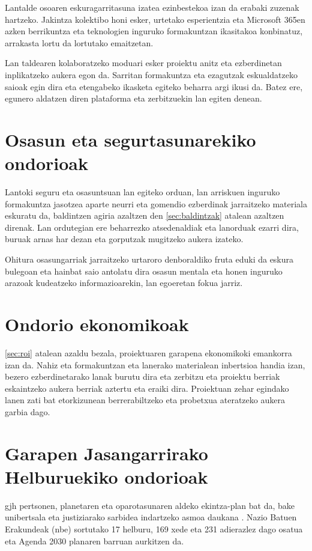 Lantalde osoaren eskuragarritasuna izatea ezinbestekoa izan da erabaki zuzenak hartzeko. Jakintza kolektibo honi esker, urtetako esperientzia eta Microsoft 365en azken berrikuntza eta teknologien inguruko  formakuntzan ikasitakoa konbinatuz, arrakasta lortu da lortutako emaitzetan.

Lan taldearen kolaboratzeko moduari esker proiektu anitz eta ezberdinetan inplikatzeko aukera egon da. Sarritan formakuntza eta ezagutzak eskualdatzeko saioak egin dira eta etengabeko ikasketa egiteko beharra
argi ikusi da. Batez ere, egunero aldatzen diren plataforma eta zerbitzuekin lan egiten denean. 
\section{Osasun eta segurtasunarekiko ondorioak}
Lantoki seguru eta osasuntsuan lan egiteko orduan, lan arriskuen inguruko formakuntza jasotzea aparte neurri eta gomendio ezberdinak jarraitzeko materiala eskuratu da, baldintzen agiria azaltzen den \ref{sec:baldintzak} atalean azaltzen direnak. Lan ordutegian ere beharrezko atsedenaldiak eta lanorduak ezarri dira, buruak arnas har dezan eta gorputzak mugitzeko aukera izateko. 

Ohitura osasungarriak jarraitzeko urtaroro denboraldiko fruta eduki da eskura bulegoan eta hainbat saio antolatu dira osasun mentala eta honen inguruko arazoak kudeatzeko informazioarekin, lan egoeretan fokua jarriz.
\section{Ondorio ekonomikoak}
\ref{sec:roi} atalean azaldu bezala, proiektuaren garapena ekonomikoki emankorra izan da. Nahiz eta formakuntzan eta lanerako materialean inbertsioa handia izan, bezero ezberdinetarako lanak burutu dira eta zerbitzu eta proiektu berriak eskaintzeko aukera berriak aztertu eta eraiki dira. Proiektuan zehar egindako lanen zati bat etorkizunean berrerabiltzeko eta probetxua ateratzeko aukera garbia dago.
\section{Garapen Jasangarrirako Helburuekiko ondorioak}
\acrfull{gjh} pertsonen, planetaren eta oparotasunaren aldeko ekintza-plan bat da, bake unibertsala eta justiziarako sarbidea indartzeko asmoa daukana \cite{gjh}. Nazio Batuen Erakundeak (\acrshort{nbe}) sortutako 17 helburu, 169 xede eta 231 adierazlez dago osatua eta Agenda 2030 planaren barruan aurkitzen da.

